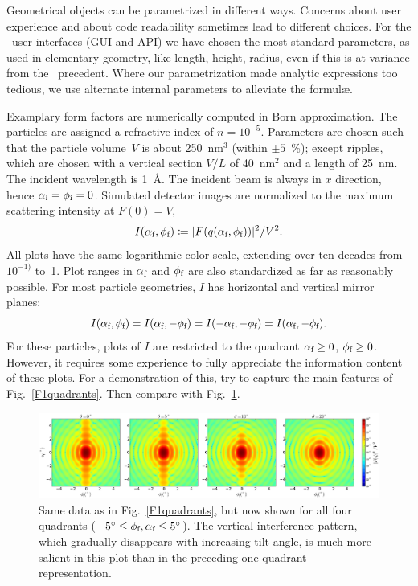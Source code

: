 Geometrical objects can be parametrized in different ways.
Concerns about user experience and about code readability
sometimes lead to different choices.
For the \BornAgain\ user interfaces (GUI and API)
we have chosen the most standard parameters,
as used in elementary geometry, like length, height, radius,
even if this is at variance from the \IsGISAXS\ precedent.
Where our parametrization made analytic expressions too tedious,
we use alternate internal parameters to alleviate the formul\ae.

Examplary form factors are numerically computed in Born approximation.
The particles are assigned a refractive index of $n=10^{-5}$.
Parameters are chosen such that
the particle volume~$V$ is about 250~nm$^3$ (within $\pm5$~\%);
except ripples, which are chosen with a vertical section $V/L$ of 40~nm$^2$
and a length of 25~nm.
The incident wavelength is 1~\AA.
The incident beam is always in $x$ direction, hence $\alpha_{\text{i}}=\phi_{\text{i}}=0$.
Simulated detector images are normalized to the maximum scattering intensity at $F(0)=V$,
\begin{equation}
  I(\alpha_{\text{f}},\phi_{\text{f}})\coloneqq |F(q(\alpha_{\text{f}},\phi_{\text{f}}))|^2/V^2.
\end{equation}
All plots have the same logarithmic color scale,
extending over ten decades from $10^{-1)}$ to~1.
Plot ranges in $\alpha_{\text{f}}$ and $\phi_{\text{f}}$ are also standardized as far as
reasonably possible.
For most particle geometries,
$I$ has horizontal and vertical mirror planes:
\begin{equation}\label{EFq4sym}
  I(\alpha_{\text{f}},\phi_{\text{f}})
  = I(\alpha_{\text{f}},-\phi_{\text{f}})
  = I(-\alpha_{\text{f}},-\phi_{\text{f}})
  = I(\alpha_{\text{f}},-\phi_{\text{f}}).
\end{equation}
For these particles,
plots of $I$ are restricted to the quadrant $\alpha_{\text{f}}\ge0$, $\phi_{\text{f}}\ge0$.
However, it requires some experience to fully appreciate the
information content of these plots.
For a demonstration of this,
try to capture the main features of Fig.~\ref{F1quadrants}.
Then compare with Fig.~\ref{F4quadrants}.

\begin{figure}[t]
\begin{center}
\includegraphics[width=\textwidth]{fig/ff2/ff_demo_4quadrants.pdf}
\end{center}
\caption{Same data as in Fig.~\protect\ref{F1quadrants},
but now shown for all four quadrants ($-5^\circ\le\phi_{\text{f}},\alpha_{\text{f}}\le 5^\circ$).
The vertical interference pattern,
which gradually disappears with increasing tilt angle,
 is much more salient in this plot
than in the preceding one-quadrant representation.}
\label{F4quadrants}
\end{figure}

